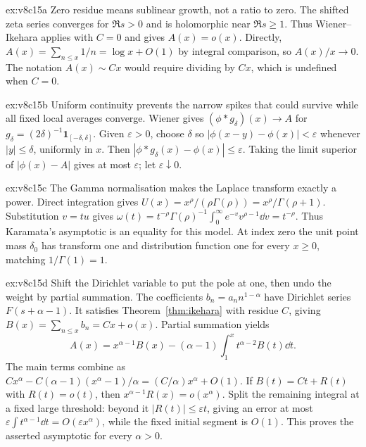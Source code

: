 \begin{solution}{ex:v8c15a}
\idea Zero residue means sublinear growth, not a ratio to zero.
\writeup The shifted zeta series converges for $\Re s>0$ and is holomorphic near $\Re s\ge1$. Thus Wiener--Ikehara applies with $C=0$ and gives $A(x)=o(x)$. Directly, $A(x)=\sum_{n\le x}1/n=\log x+O(1)$ by integral comparison, so $A(x)/x\to0$. The notation $A(x)\sim Cx$ would require dividing by $Cx$, which is undefined when $C=0$.
\end{solution}
\begin{solution}{ex:v8c15b}
\idea Uniform continuity prevents the narrow spikes that could survive while all fixed local averages converge.
\writeup Wiener gives $(\phi*g_\delta)(x)\to A$ for $g_\delta=(2\delta)^{-1}\mathbf1_{[-\delta,\delta]}$. Given $\varepsilon>0$, choose $\delta$ so $|\phi(x-y)-\phi(x)|<\varepsilon$ whenever $|y|\le\delta$, uniformly in $x$. Then $|\phi*g_\delta(x)-\phi(x)|\le\varepsilon$. Taking the limit superior of $|\phi(x)-A|$ gives at most $\varepsilon$; let $\varepsilon\downarrow0$.
\end{solution}
\begin{solution}{ex:v8c15c}
\idea The Gamma normalisation makes the Laplace transform exactly a power.
\writeup Direct integration gives $U(x)=x^\rho/(\rho\Gamma(\rho))=x^\rho/\Gamma(\rho+1)$. Substitution $v=tu$ gives $\omega(t)=t^{-\rho}\Gamma(\rho)^{-1}\int_0^\infty e^{-v}v^{\rho-1}\dd v=t^{-\rho}$. Thus Karamata's asymptotic is an equality for this model. At index zero the unit point mass $\delta_0$ has transform one and distribution function one for every $x\ge0$, matching $1/\Gamma(1)=1$.
\end{solution}
\begin{solution}{ex:v8c15d}
\idea Shift the Dirichlet variable to put the pole at one, then undo the weight by partial summation.
\writeup The coefficients $b_n=a_nn^{1-\alpha}$ have Dirichlet series $F(s+\alpha-1)$. It satisfies Theorem~\ref{thm:ikehara} with residue $C$, giving $B(x)=\sum_{n\le x}b_n=Cx+o(x)$. Partial summation yields
\[A(x)=x^{\alpha-1}B(x)-(\alpha-1)\int_1^xt^{\alpha-2}B(t)\dd t.
\]
The main terms combine as $Cx^\alpha-C(\alpha-1)(x^\alpha-1)/\alpha=(C/\alpha)x^\alpha+O(1)$. If $B(t)=Ct+R(t)$ with $R(t)=o(t)$, then $x^{\alpha-1}R(x)=o(x^\alpha)$. Split the remaining integral at a fixed large threshold: beyond it $|R(t)|\le\varepsilon t$, giving an error at most $\varepsilon\int t^{\alpha-1}\dd t=O(\varepsilon x^\alpha)$, while the fixed initial segment is $O(1)$. This proves the asserted asymptotic for every $\alpha>0$.
\end{solution}

